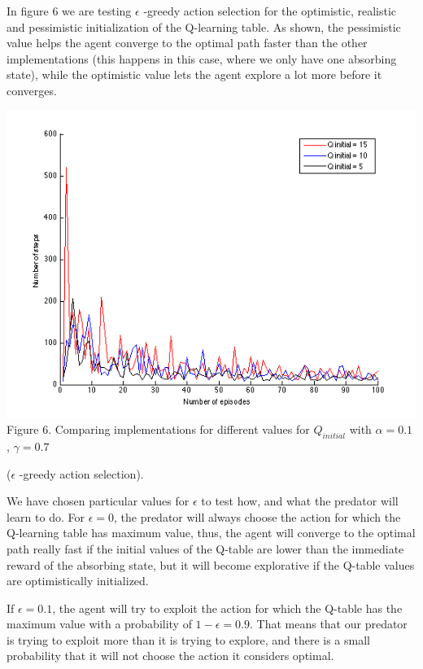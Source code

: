 \documentclass[a4paper,11pt]{article}
\begin{document}
In figure 6 we are testing $\epsilon$ -greedy action selection for the optimistic, realistic and pessimistic initialization of the Q-learning table. As shown, the pessimistic value helps the agent converge to the optimal path faster than the other implementations (this happens in this case, where we only have one absorbing state), while the optimistic value lets the agent explore a lot more before it converges.


\begin{center}

\includegraphics[width=1.0\textwidth,height=0.4\textheight]{realpesopt.png}
\label{Figure 5}
Figure 6. 	Comparing implementations for different values for $Q_{initial}$  with $\alpha = 0.1$ , $\gamma=0.7$ 

($\epsilon$ -greedy action selection).\vspace{1cm}

\end{center}


We have chosen particular values for $\epsilon$ to test how, and what the predator will learn to do. For $\epsilon = 0$, the predator will always choose the action for which the Q-learning table has maximum value, thus, the agent will converge to the optimal path really fast if the initial values of the Q-table are lower than the immediate reward of the absorbing state, but it will become explorative if the Q-table values are optimistically initialized.


If $\epsilon = 0.1$, the agent will try to exploit the action for which the Q-table has the maximum value with a probability of $1-\epsilon = 0.9$. That means that our predator is trying to exploit more than it is trying to explore, and there is a small probability that it will not choose the action it considers optimal.
\end{document}
